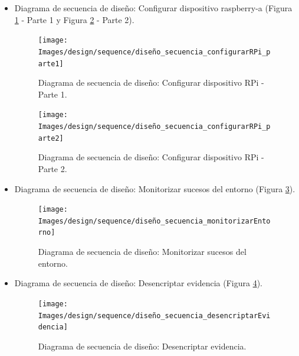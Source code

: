 \documentclass[12pt,a4paper, twoside]{report}
\begin{document}
	\begin{itemize}
		\item Diagrama de secuencia de diseño: Configurar dispositivo \gls{raspberry-a} (Figura \ref{fig:design_configurarRPi1} - Parte 1 y Figura \ref{fig:design_configurarRPi2} - Parte 2).
		
		\begin{figure}[!ht]   
			\caption{Diagrama de secuencia de diseño: Configurar dispositivo RPi - Parte 1.} 
			\begin{center} 
	 			\texttt{[image: Images/design/sequence/diseño\_secuencia\_configurarRPi\_parte1]} \\
				\label{fig:design_configurarRPi1} 
			\end{center}  
		\end{figure} 
		
		\begin{figure}[!ht]   
			\caption{Diagrama de secuencia de diseño: Configurar dispositivo RPi - Parte 2.} 
			\begin{center} 
				\texttt{[image: Images/design/sequence/diseño\_secuencia\_configurarRPi\_parte2]} \\
				\label{fig:design_configurarRPi2} 
			\end{center}  
		\end{figure} 
		
		\newpage
		 
		\item Diagrama de secuencia de diseño: Monitorizar sucesos del entorno (Figura \ref{fig:design_monitorizarEntorno}).
		
		\begin{figure}[!ht]   
			\caption{Diagrama de secuencia de diseño: Monitorizar sucesos del entorno.} 
			\begin{center} 
				\texttt{[image: Images/design/sequence/diseño\_secuencia\_monitorizarEntorno]} \\
				\label{fig:design_monitorizarEntorno} 
			\end{center}  
		\end{figure} 

		\newpage
		
		\item Diagrama de secuencia de diseño: Desencriptar evidencia (Figura \ref{fig:design_desencriptar}).

		\begin{figure}[!ht]   
			\caption{Diagrama de secuencia de diseño: Desencriptar evidencia.} 
			\begin{center} 
	 			\texttt{[image: Images/design/sequence/diseño\_secuencia\_desencriptarEvidencia]} \\
				\label{fig:design_desencriptar} 
			\end{center}  
		\end{figure} 
		

\end{itemize}
\end{document}
